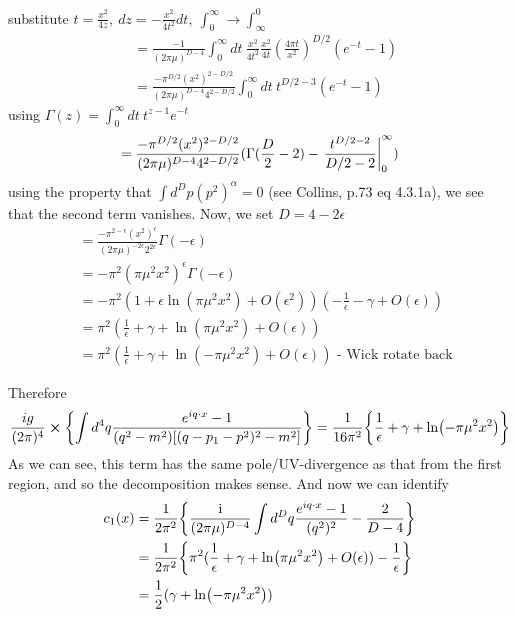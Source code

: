 \documentclass{scrartcl}
\begin{document}
substitute $t = \frac{x^2}{4z},\ dz=-\frac{x^2}{4t^2}dt,\ \int_0^\infty \rightarrow \int_\infty^0$
\begin{equation}
\begin{split}    
    &= \frac{-1}{(2\pi\mu)^{D-4}}\int_0^\infty  dt\ \frac{x^2}{4t^2} \frac{x^2}{4t}
    (\frac{4\pi t}{x^2})^{D/2}(e^{-t}-1)\\
    &= \frac{-\pi^{D/2}(x^2)^{2-D/2}}{(2\pi\mu)^{D-4}4^{2-D/2}}\int_0^\infty  dt\ t^{D/2-3}(e^{-t}-1)
\end{split}
\end{equation}
using $\Gamma(z)=\int_0^\infty dt\ t^{z-1}e^{-t}$
\begin{equation}
    = \frac{-\pi^{D/2}(x^2)^{2-D/2}}{(2\pi\mu)^{D-4}4^{2-D/2}}(\Gamma(\frac{D}{2}-2)-\eval{\frac{t^{D/2-2}}{D/2-2}}_0^\infty )
\end{equation}
using the property that $\int d^Dp(p^2)^\alpha = 0$ (see Collins, p.73 eq 4.3.1a), we see that the second term vanishes. Now, we set $D=4-2\epsilon$
\begin{equation}
\begin{split}
    &= \frac{-\pi^{2-\epsilon}(x^2)^{\epsilon}}{(2\pi\mu)^{-2\epsilon}2^{2\epsilon}}\Gamma(-\epsilon)\\
    &= -\pi^2(\pi\mu^2 x^2)^\epsilon\Gamma(-\epsilon)\\
    &= -\pi^2 (1+\epsilon \ln(\pi \mu^2 x^2)+O(\epsilon^2))(-\frac{1}{\epsilon}-\gamma+O(\epsilon))\\
    &= \pi^2(\frac{1}{\epsilon}+\gamma+\ln(\pi\mu^2 x^2)+O(\epsilon))\\
    &= \pi^2(\frac{1}{\epsilon}+\gamma+\ln(-\pi\mu^2 x^2)+O(\epsilon))\text{ - Wick rotate back}
\end{split}
\end{equation}

Therefore
\begin{equation}
    \frac{ig}{(2\pi)^4}\cross\qty{\int d^4q \frac{e^{iq\cdot x}-1}{(q^2-m^2)[(q-p_1-p^2)^2-m^2]}} = \frac{1}{16\pi^2}\qty{\frac{1}{\epsilon}+\gamma+\ln(-\pi\mu^2 x^2)}
\end{equation}
As we can see, this term has the same pole/UV-divergence as that from the first region, and so the decomposition makes sense. And now we can identify
\begin{equation}
\begin{split}
    c_1(x) &= \frac{1}{2\pi^2} \qty{\frac{\text{i}}{(2\pi\mu)^{D-4}}\int d^Dq\frac{e^{iq\cdot x}-1}{(q^2)^2}-\frac{2}{D-4}}\\
    &=\frac{1}{2\pi^2} \qty{\pi^2(\frac{1}{\epsilon}+\gamma+\ln(\pi\mu^2 x^2)+O(\epsilon))-\frac{1}{\epsilon}}\\
    &=\frac{1}{2}(\gamma+\ln(-\pi\mu^2 x^2))
\end{split}
\end{equation}
\end{document}
